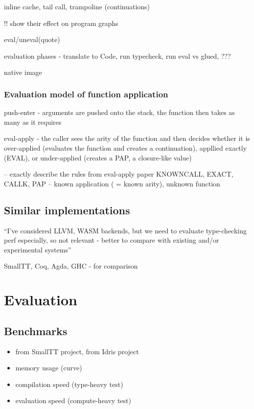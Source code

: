\documentclass[english,zadani,odsaz]{fitthesis}
\begin{document}
inline cache, tail call, trampoline (continuations)

!! show their effect on program graphs

eval/uneval(quote)

evaluation phases - translate to Code, run typecheck, run eval vs glued, ???

native image

\subsection{Evaluation model of function application}
\label{sec:org541f92d}
push-enter - arguments are pushed onto the stack, the function then takes as
many as it requires

eval-apply - the caller sees the arity of the function and then decides whether
it is over-applied (evaluates the function and creates a continuation), appllied
exactly (EVAL), or under-applied (creates a PAP, a closure-like value)

-- exactly describe the rules from eval-apply paper KNOWNCALL, EXACT, CALLK, PAP
-- known application ( = known arity), unknown function


\section{Similar implementations}
\label{sec:orgea74763}
``I've considered LLVM, WASM backends, but we need to evaluate type-checking
perf especially, so not relevant - better to compare with existing and/or
experimental systems''

SmallTT, Coq, Agda, GHC - for comparison

\chapter{Evaluation}
\label{sec:orgf507896}
\section{Benchmarks}
\label{sec:org8a6ee3e}
\begin{itemize}
\item from SmallTT project, from Idris project
\item memory usage (curve)
\item compilation speed (type-heavy test)
\item evaluation speed (compute-heavy test)
\end{itemize}
\end{document}
